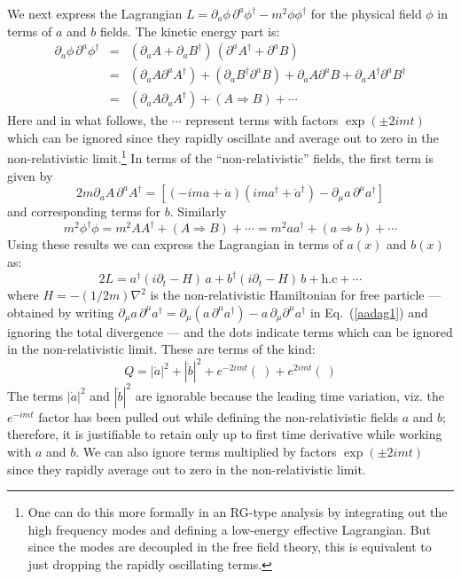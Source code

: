 \documentclass{article}
\def\eq#1{{Eq.~(\ref{#1})}}
\begin{document}
 We next express the  Lagrangian $L=\partial_a \phi \, \partial^a \phi^\dagger-m^2\phi\phi^\dagger$ for the physical field $\phi$ in terms of $a$ and $b$ fields. The kinetic energy part is:
\begin{eqnarray}
 \partial_a \phi \, \partial^a \phi^\dagger &=& \left(\partial_a A+\partial_a  B^\dagger \right) \, \left(\partial^a A^\dagger + \partial^a B\right) \\
 &=& \left(\partial_a A \partial^a A^\dagger\right) +  \left(\partial_a B^\dagger \partial^a  B\right) + \partial_a A\partial^a B + \partial_a A^\dagger \partial^a  B^\dagger\nonumber\\ 
 &=& \left(\partial_a A \partial_a A^\dagger\right) +  \left( A\Rightarrow B \right) + \cdots
\end{eqnarray} 
Here and in what follows, the $\cdots$ represent terms with factors $\exp(\pm 2imt)$ which can be ignored
since they rapidly oscillate and average out to zero in the non-relativistic limit.\footnote{One can do this more formally in an RG-type analysis by integrating out the high frequency modes and defining a low-energy effective Lagrangian. But since the modes are decoupled in the free field theory, this is equivalent to just dropping the rapidly oscillating terms.}
In terms of the ``non-relativistic'' fields, the first term is given by
\begin{equation}
 2m \partial_a A \, \partial^a A^\dagger= \left[ \left( - i m a + \dot a\right) \left( i m a^\dagger + \dot a^\dagger\right) - \partial_\mu a\, \partial^\mu a^\dagger\right]
 \label{aadag1}
\end{equation} 
and corresponding terms for $b$.
Similarly
\begin{equation}
 m^2 \phi^\dagger \phi  = m^2 AA^\dagger +  \left( A\Rightarrow B \right) + \cdots
 = m^2 aa^\dagger +  \left( a\Rightarrow b \right) + \cdots
\end{equation} 
Using these results we can express the  Lagrangian in terms of $a(x)$ and $b(x)$ as:
\begin{equation}
 2 L = a^\dagger \left( i \partial_t - H\right)\, a + b^\dagger \left( i \partial_t - H\right) \, b + \text{h.c} + \cdots
 \label{onetwoeight}
\end{equation} 
where $H=-(1/2m)\nabla^2$ is the non-relativistic Hamiltonian for free particle --- obtained by writing $\partial_\mu a\, \partial^\mu a^\dagger=
\partial_\mu (a\, \partial^\mu a^\dagger)-a\,\partial_\mu\partial^\mu a^\dagger$ in \eq{aadag1} and ignoring the total divergence ---
and
the dots indicate terms which can be ignored   in the non-relativistic  limit. These are terms of the kind:
\begin{equation}
 Q = |\dot a|^2  + |\dot b|^2 + e^{-2imt} (\ ) +  e^{2imt} (\ )
\end{equation} 
 The terms $|\dot a|^2$ and $|\dot b|^2$ are ignorable because the leading time variation, viz. the $e^{-imt}$ factor has been pulled out  while defining the non-relativistic fields $a$ and $b$; therefore, it is justifiable to retain only up to first time derivative while working with $a$ and $b$. We can also ignore terms multiplied by factors $\exp(\pm 2imt)$ since they rapidly average out to zero in the non-relativistic limit.
  
\end{document}
